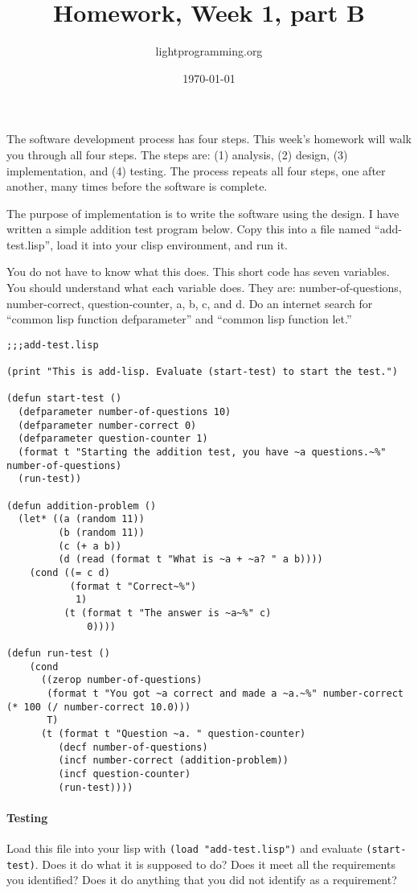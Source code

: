 \documentclass{article}
\title{Homework, Week 1, part B}
\author{lightprogramming.org}
\date{\today}
\begin{document}
\maketitle{}

The software development process has four steps. This week's homework will walk you through all four steps. The steps are: (1) analysis, (2) design, (3) implementation, and (4) testing. The process repeats all four steps, one after another, many times before the software is complete.

The purpose of implementation is to write the software using the design. I have written a simple addition test program below. Copy this into a file named ``add-test.lisp'', load it into your clisp environment, and run it.

You do not have to know what this does. This short code has seven variables. You should understand what each variable does. They are: number-of-questions, number-correct, question-counter, a, b, c, and d. Do an internet search for ``common lisp function defparameter'' and ``common lisp function let.''

\lstset{language=Lisp,numbers=left,keepspaces=true,basicstyle=\small,numberstyle=\tiny,showstringspaces=false,breaklines=true}
\begin{lstlisting}
;;;add-test.lisp

(print "This is add-lisp. Evaluate (start-test) to start the test.")

(defun start-test ()
  (defparameter number-of-questions 10)
  (defparameter number-correct 0)
  (defparameter question-counter 1)
  (format t "Starting the addition test, you have ~a questions.~%" number-of-questions)
  (run-test))

(defun addition-problem ()
  (let* ((a (random 11))
         (b (random 11))
         (c (+ a b))
         (d (read (format t "What is ~a + ~a? " a b))))
    (cond ((= c d)
           (format t "Correct~%")
            1)
          (t (format t "The answer is ~a~%" c)
              0))))

(defun run-test ()
    (cond 
      ((zerop number-of-questions)
       (format t "You got ~a correct and made a ~a.~%" number-correct (* 100 (/ number-correct 10.0)))
       T)
      (t (format t "Question ~a. " question-counter)
         (decf number-of-questions)
         (incf number-correct (addition-problem))
		 (incf question-counter)
         (run-test))))
\end{lstlisting}

\paragraph{Testing}Load this file into your lisp with \texttt{(load "add-test.lisp")} and evaluate \texttt{(start-test)}. Does it do what it is supposed to do? Does it meet all the requirements you identified? Does it do anything that you did not identify as a requirement?
\end{document}
